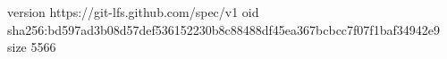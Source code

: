 version https://git-lfs.github.com/spec/v1
oid sha256:bd597ad3b08d57def536152230b8c88488df45ea367bcbcc7f07f1baf34942e9
size 5566
